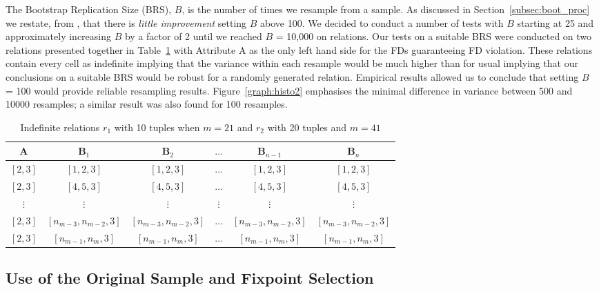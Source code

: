 The Bootstrap Replication Size (BRS), $B$, is the number of times we
resample from a sample. As discussed in Section~\ref{subsec:boot_proc}
we restate, from \cite{et86}, that there is {\em little improvement}
setting $B$ above 100. We decided to conduct a number of tests with
$B$ starting at 25 and approximately increasing $B$ by a factor of 2
until we reached $B$ = 10,000 on relations. Our tests on a suitable BRS
were conducted on two relations presented together in
Table~\ref{table:brs_testset} with Attribute A as the only left hand
side for the FDs guaranteeing FD violation. These relations contain
every cell as 
indefinite implying that the variance within each resample would be
much higher than for usual implying that our conclusions on a suitable
BRS would be robust for a randomly generated relation. Empirical
results allowed us to conclude that setting $B$ = 100 would provide
reliable resampling results. Figure~\ref{graph:histo2} emphasises the
minimal difference in variance between 500 and 10000 resamples; a
similar result was also found for 100 resamples.


{\line
\begin{table}[ht]
\begin{center}
\begin{tabular}{|c|c|c|c|c|c|} \hline 
 {A } & {\bf B$_1$ } & { \bf B$_2$  } & {\bf $\ldots$ } & {\bf B$_{n-1}$} & { \bf B$_n$ } \\ \hline
$[2,3]$	& $[1,2,3]$ & $[1,2,3]$  & $\ldots$ &  $[1,2,3]$ & $[1,2,3]$ \\
$[2,3]$	& $[4,5,3]$ & $[4,5,3]$  & $\ldots$ &  $[4,5,3]$ & $[4,5,3]$ \\
$\vdots$	& $\vdots$ & $\vdots$  & $\vdots$ &   $\vdots$ & $\vdots$ \\
$[2,3]$	& $[n_{m-3},n_{m-2},3]$ & $[n_{m-3},n_{m-2},3]$  & $\ldots$ &  $[n_{m-3},n_{m-2},3]$ & $[n_{m-3},n_{m-2},3]$ \\
$[2,3]$		& $[n_{m-1},n_m,3]$ & $[n_{m-1},n_m,3]$  & $\ldots$ &  $[n_{m-1},n_m,3]$ & $[n_{m-1},n_m,3]$ \\ \hline
\end{tabular}
\end{center}
\caption{\label{table:brs_testset} Indefinite relations $r_1$ with 10 tuples when $m = 21$ and $r_2$ with
20 tuples and $m = 41$}
\end{table}
}


\subsection{Use of the Original Sample and Fixpoint Selection}

